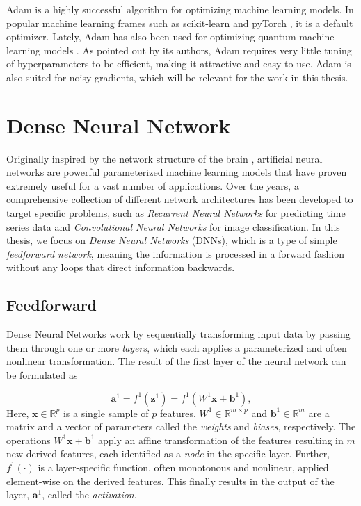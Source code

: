 Adam is a highly successful algorithm for optimizing machine learning models. In popular machine learning frames such as scikit-learn \cite{scikit-learn} and pyTorch \cite{pytorch}, it is a default optimizer. Lately, Adam has also been used for optimizing quantum machine learning models \cite{abbas2020power, skolik2020layerwise}. As pointed out by its authors, Adam requires very little tuning of hyperparameters to be efficient, making it attractive and easy to use. Adam is also suited for noisy gradients, which will be relevant for the work in this thesis. 

\section{Dense Neural Network}\label{sec:DenseNeuralNetwork}
Originally inspired by the network structure of the brain \cite{hands-on}, artificial neural networks are powerful parameterized machine learning models that have proven extremely useful for a vast number of applications. Over the years, a comprehensive collection of different network architectures has been developed to target specific problems, such as \emph{Recurrent Neural Networks} for predicting time series data and \emph{Convolutional Neural Networks} for image classification. In this thesis, we focus on \emph{Dense Neural Networks} (DNNs), which is a type of simple \emph{feedforward network}, meaning the information is processed in a forward fashion without any loops that direct information backwards.

\subsection{Feedforward}\label{sec:FeedforwardDNN}
Dense Neural Networks work by sequentially transforming input data by passing them through one or more \emph{layers}, which each applies a parameterized and often nonlinear transformation. The result of the first layer of the neural network can be formulated as

\begin{equation}\label{eq:FeedforwardSingle}
    \boldsymbol{a}^1 = f^1(\boldsymbol{z}^1) = f^1(W^1 \boldsymbol{x} + \boldsymbol{b}^1),
\end{equation}
Here, $\boldsymbol{x} \in \mathbb{R}^p$ is a single sample of $p$ features. $W^1 \in \mathbb{R}^{m \times p}$ and $\boldsymbol{b}^1 \in \mathbb{R}^{m}$ are a matrix and a vector of parameters called the \emph{weights} and \emph{biases}, respectively. The operations $W^1 \boldsymbol{x} + \boldsymbol{b}^1$ apply an affine transformation of the features resulting in $m$ new derived features, each identified as a \emph{node} in the specific layer. Further, $f^1(\cdot)$ is a layer-specific function, often monotonous and nonlinear, applied element-wise on the derived features. This finally results in the output of the layer, $\boldsymbol{a}^1$, called the \emph{activation}.

